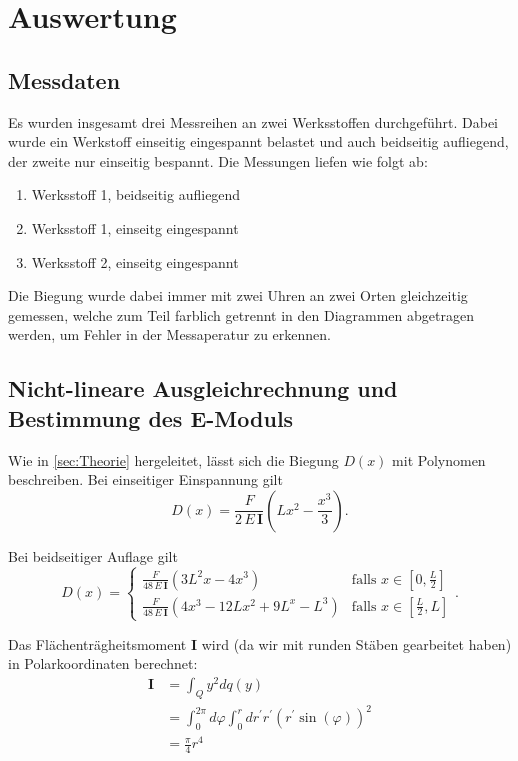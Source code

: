 \section{Auswertung}
\label{sec:Auswertung}

\subsection{Messdaten}
\label{sec:Messdaten}
Es wurden insgesamt drei Messreihen an zwei Werksstoffen durchgeführt. Dabei
wurde ein Werkstoff einseitig eingespannt belastet und auch beidseitig aufliegend,
der zweite nur einseitig bespannt. Die Messungen liefen wie folgt ab:
\begin{enumerate}
	\item Werksstoff 1, beidseitig aufliegend
	\item Werksstoff 1, einseitg eingespannt 
	\item Werksstoff 2, einseitg eingespannt 
\end{enumerate}

Die Biegung wurde dabei immer mit zwei Uhren an zwei Orten gleichzeitig 
gemessen, welche zum Teil farblich getrennt in den Diagrammen abgetragen werden,
um Fehler in der Messaperatur zu erkennen.

\subsection{Nicht-lineare Ausgleichrechnung und Bestimmung des E-Moduls}
Wie in \autoref{sec:Theorie} hergeleitet, lässt sich die Biegung $D(x)$ mit 
Polynomen beschreiben. Bei einseitiger Einspannung gilt
\begin{equation}
	D(x) = \frac{F}{2 \, E \, \mathbf{I}} \left(Lx^2 - \frac{x^3}{3} \right).
	\label{eqn:d_einseitig}
\end{equation}

Bei beidseitiger Auflage gilt
\begin{equation}
	D(x) =
	\begin{cases}
		\frac{F}{48 \, E \, \mathbf{I}}  
		\left( 3L^2x - 4x^3 \right)
		& \text{falls } x \in \left[0, \frac L2 \right] \\
		\frac{F}{48 \, E \, \mathbf{I}}  
		\left( 4x^3 - 12Lx^2 + 9L^x - L^3 \right)
		& \text{falls } x \in \left[ \frac L2, L \right]
	\end{cases}
	.
	\label{eqn:d_beidseitig}
\end{equation}

Das Flächenträgheitsmoment $\mathbf{I}$ wird (da wir mit runden Stäben gearbeitet
haben) in Polarkoordinaten berechnet:
\begin{align}
	\mathbf{I} 
	&= \int_Q y^2 dq(y) 
	\\
	&= \int_0^{2\pi} d\varphi \int_0^r dr^\prime r^\prime 
	\left( r^\prime\sin(\varphi) \right)^2
	\\
	&= \frac{\pi}{4} r^4
\end{align}

